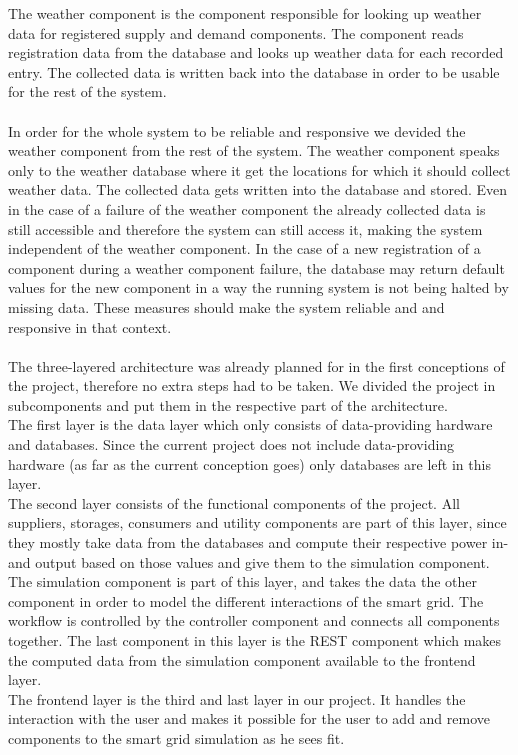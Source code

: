 The weather component is the component responsible for looking up weather data for registered supply and demand components.
The component reads registration data from the database and looks up weather data for each recorded entry.
The collected data is written back into the database in order to be usable for the rest of the system.\\
\\
In order for the whole system to be reliable and responsive we devided the weather component from the rest of the system.
The weather component speaks only to the weather database where it get the locations for which it should collect weather data.
The collected data gets written into the database and stored.
Even in the case of a failure of the weather component the already collected data is still accessible and therefore the system can still access it, making the system independent of the weather component.
In the case of a new registration of a component during a weather component failure, the database may return default values for the new component in a way the running system is not being halted by missing data.
These measures should make the system reliable and and responsive in that context.\\
\\
The three-layered architecture was already planned for in the first conceptions of the project, therefore no extra steps had to be taken.
We divided the project in subcomponents and put them in the respective part of the architecture.\\
The first layer is the data layer which only consists of data-providing hardware and databases. Since the current project does not include data-providing hardware (as far as the current conception goes) only databases are left in this layer.\\
The second layer consists of the functional components of the project.
All suppliers, storages, consumers and utility components are part of this layer, since they mostly take data from the databases and compute their respective power in- and output based on those values and give them to the simulation component.
The simulation component is part of this layer, and takes the data the other component in order to model the different interactions of the smart grid.
The workflow is controlled by the controller component and connects all components together.
The last component in this layer is the REST component which makes the computed data from the simulation component available to the frontend layer.\\
The frontend layer is the third and last layer in our project.
It handles the interaction with the user and makes it possible for the user to add and remove components to the smart grid simulation as he sees fit.
